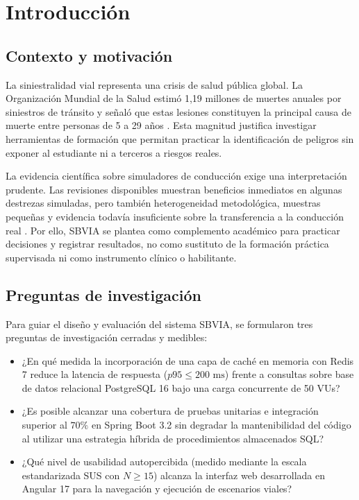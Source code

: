 \documentclass[11pt,a4paper]{report}
\begin{document}
\chapter{Introducción}
\section{Contexto y motivación}
La siniestralidad vial representa una crisis de salud pública global. La Organización Mundial de la Salud estimó 1,19 millones de muertes anuales por siniestros de tránsito y señaló que estas lesiones constituyen la principal causa de muerte entre personas de 5 a 29 años \cite{who2023roadsafety}. Esta magnitud justifica investigar herramientas de formación que permitan practicar la identificación de peligros sin exponer al estudiante ni a terceros a riesgos reales.

La evidencia científica sobre simuladores de conducción exige una interpretación prudente. Las revisiones disponibles muestran beneficios inmediatos en algunas destrezas simuladas, pero también heterogeneidad metodológica, muestras pequeñas y evidencia todavía insuficiente sobre la transferencia a la conducción real \cite{martin2019simulator, alonso2023simulators, krasniuk2024simulator}. Por ello, SBVIA se plantea como complemento académico para practicar decisiones y registrar resultados, no como sustituto de la formación práctica supervisada ni como instrumento clínico o habilitante.

\section{Preguntas de investigación}
Para guiar el diseño y evaluación del sistema SBVIA, se formularon tres preguntas de investigación cerradas y medibles:
\begin{itemize}
    \item[\textbf{RQ1:}] ¿En qué medida la incorporación de una capa de caché en memoria con Redis 7 reduce la latencia de respuesta ($p95 \le 200\text{ ms}$) frente a consultas sobre base de datos relacional PostgreSQL 16 bajo una carga concurrente de 50 VUs?
    \item[\textbf{RQ2:}] ¿Es posible alcanzar una cobertura de pruebas unitarias e integración superior al $70\%$ en Spring Boot 3.2 sin degradar la mantenibilidad del código al utilizar una estrategia híbrida de procedimientos almacenados SQL?
    \item[\textbf{RQ3:}] ¿Qué nivel de usabilidad autopercibida (medido mediante la escala estandarizada SUS con $N \ge 15$) alcanza la interfaz web desarrollada en Angular 17 para la navegación y ejecución de escenarios viales?
\end{itemize}
\end{document}
